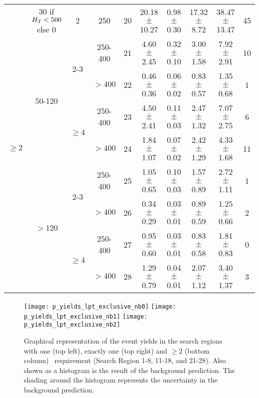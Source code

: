 \begin{table}
{\begin{minipage}{\textwidth}
\begin{tabular}{|c|c|c|c|c|c|c|c|c|c|}
\multirow{9}{*}{$\geq 2$} & 30 if $H_{\mathrm{T}}<500$ else 0  & 2                         & 250     & 20 & 20.18$\pm$10.27   & 0.98$\pm$0.30 & 17.32$\pm$8.72   & 38.47$\pm$13.47   & 45      \\ \cline{2-5}  
                          & \multirow{4}{*}{50-120} & \multirow{2}{*}{2-3}      & 250-400 & 21 & 4.60$\pm$2.45     & 0.32$\pm$0.10 & 3.00$\pm$1.58    & 7.92$\pm$2.91     & 10      \\ \cline{4-5}  
                          &                         &                           & $>400$  & 22 & 0.46$\pm$0.36     & 0.06$\pm$0.02 & 0.83$\pm$0.57    & 1.35$\pm$0.68     & 1       \\ \cline{3-5}  
                          &                         & \multirow{2}{*}{$\geq 4$} & 250-400 & 23 & 4.50$\pm$2.41     & 0.11$\pm$0.03 & 2.47$\pm$1.32    & 7.07$\pm$2.75     & 6       \\ \cline{4-5}  
                          &                         &                           & $>400$  & 24 & 1.84$\pm$1.07     & 0.07$\pm$0.02 & 2.42$\pm$1.29    & 4.33$\pm$1.68     & 11      \\ \cline{2-5}  
                          & \multirow{4}{*}{$>120$} & \multirow{2}{*}{2-3}      & 250-400 & 25 & 1.05$\pm$0.65     & 0.10$\pm$0.03 & 1.57$\pm$0.89    & 2.72$\pm$1.11     & 1       \\ \cline{4-5}  
                          &                         &                           & $>400$  & 26 & 0.34$\pm$0.29     & 0.03$\pm$0.01 & 0.89$\pm$0.59    & 1.25$\pm$0.66     & 2       \\ \cline{3-5}  
                          &                         & \multirow{2}{*}{$\geq 4$} & 250-400 & 27 & 0.95$\pm$0.60     & 0.03$\pm$0.01 & 0.83$\pm$0.58    & 1.81$\pm$0.83     & 0       \\ \cline{4-5}  
                          &                         &                           & $>400$  & 28 & 1.29$\pm$0.79     & 0.04$\pm$0.01 & 2.07$\pm$1.12    & 3.40$\pm$1.37     & 3       \\ \hline       
\end{tabular}
\end{minipage}
}
\end{table}
\begin{figure}[!hbt]
\begin{center}
\texttt{[image: p\_yields\_lpt\_exclusive\_nb0]}
\texttt{[image: p\_yields\_lpt\_exclusive\_nb1]}
\texttt{[image: p\_yields\_lpt\_exclusive\_nb2]}
\caption[Graphical representation of the event yields in the \lpt search regions]
{\label{fig:results_lpt_yield_sr}
Graphical representation of the event yields in the \lpt search regions
with one (top left), exactly one (top right) and $\geq 2$ (bottom column)
\nbtags~requirement (Search Region 1-8, 11-18, and 21-28). Also shown as a histogram
is the result of the background prediction. The shading around the histogram
represents the uncertainty in the background prediction.
}
\end{center}
\end{figure}
